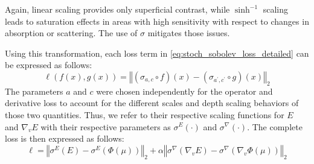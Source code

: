 \documentclass[journal,twoside,web]{ieeecolor}
\begin{document}
Again, linear scaling provides only superficial contrast, while $\sinh^{-1}$ scaling leads to saturation effects in areas with high sensitivity with respect to changes in absorption or scattering. %
The use of $\sigma$ mitigates those issues. %
\par
Using this transformation, each loss term in \eqref{eq:stoch_sobolev_loss_detailed} can be expressed as follows:
\begin{equation}
	\ell(f(x), g(x)) = \left\Vert (\sigma_{a, c} \circ f)(x) - (\sigma_{a^\prime,c^\prime} \circ g)(x) \right\Vert_2
\end{equation}
The parameters $a$ and $c$ were chosen independently for the operator and derivative loss to account for the different scales and depth scaling behaviors of those two quantities. %
Thus, we refer to their respective scaling functions for $E$ and $\nabla_v E$ with their respective parameters as $\sigma^E(\cdot)$ and $\sigma^\nabla(\cdot)$. %
The complete loss is then expressed as follows:
\begin{equation}
    \ell = \left\Vert \sigma^E(E) - \sigma^E(\Phi(\mu))\right\Vert_2 + \alpha \left\Vert \sigma^\nabla(\nabla_v E) - \sigma^\nabla(\nabla_v\Phi(\mu))\right\Vert_2
    \label{eq:loss}
\end{equation}
\end{document}
